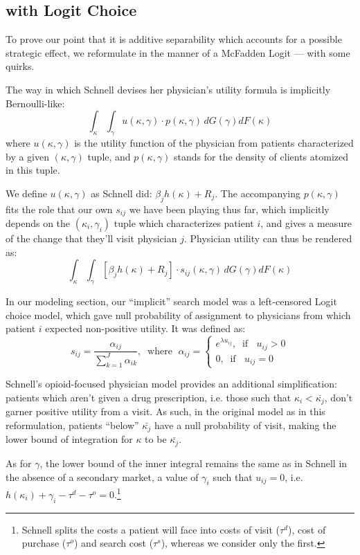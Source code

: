 \documentclass[../main.tex]{subfiles}
\begin{document}
\subsection{\cite{schnell2017physician} with Logit Choice}
\label{sec:schnell_logit}

To prove our point that it is additive separability which accounts for a possible strategic effect, we reformulate \cite{schnell2017physician} in the manner of a McFadden Logit — with some quirks.

The way in which Schnell devises her physician's utility formula is implicitly Bernoulli-like:
\[
\int_{\kappa} \int_{\gamma} u(\kappa, \gamma) \cdot p(\kappa, \gamma) \, dG(\gamma) dF(\kappa)
\]
where $u(\kappa, \gamma)$ is the utility function of the physician from patients characterized by a given $(\kappa, \gamma)$ tuple, and $p(\kappa, \gamma)$ stands for the density of clients atomized in this tuple.

We define $u(\kappa, \gamma)$ as Schnell did: $\beta_j h(\kappa) + R_j$. The accompanying $p(\kappa, \gamma)$ fits the role that our own $s_{ij}$ we have been playing thus far, which implicitly depends on the $(\kappa_i, \gamma_i)$ tuple which characterizes patient $i$, and gives a measure of the change that they'll visit physician $j$. Physician utility can thus be rendered as:
\[
\int_{\kappa} \int_{\gamma} [\beta_j h(\kappa) + R_j] \cdot s_{ij}(\kappa, \gamma) \, dG(\gamma) dF(\kappa)
\]


In our modeling section, our ``implicit'' search model was a left-censored Logit choice model, which gave null probability of assignment to physicians from which patient $i$ expected non-positive utility. It was defined as:
\[
s_{ij} = \frac{\alpha_{ij}}{\sum_{k = 1}^{J} \alpha_{ik}}, \; \; \text{where } \; \alpha_{ij} = \begin{cases}
e^{\lambda u_{ij}}, \; \; \text{if } \; \; u_{ij} > 0 \\
0 , \; \; \text{if } \; \; u_{ij} = 0
\end{cases}
\]

Schnell's opioid-focused physician model provides an additional simplification: patients which aren't given a drug prescription, i.e. those such that $\kappa_i < \bar{\kappa_j}$, don't garner positive utility from a visit. As such, in the original model as in this reformulation, patients ``below'' $\bar{\kappa_j}$ have a null probability of visit, making the lower bound of integration for $\kappa$ to be $\bar{\kappa_j}$.

As for $\gamma$, the lower bound of the inner integral remains the same as in Schnell in the absence of a secondary market, a value of $\gamma_i$ such that $u_{ij} = 0$, i.e. $h(\kappa_i) + \gamma_i - \tau^d - \tau^o = 0$.\footnote{Schnell splits the costs a patient will face into costs of visit ($\tau^d$), cost of purchase ($\tau^o$) and search cost ($\tau^s$), whereas we consider only the first.}
\end{document}
